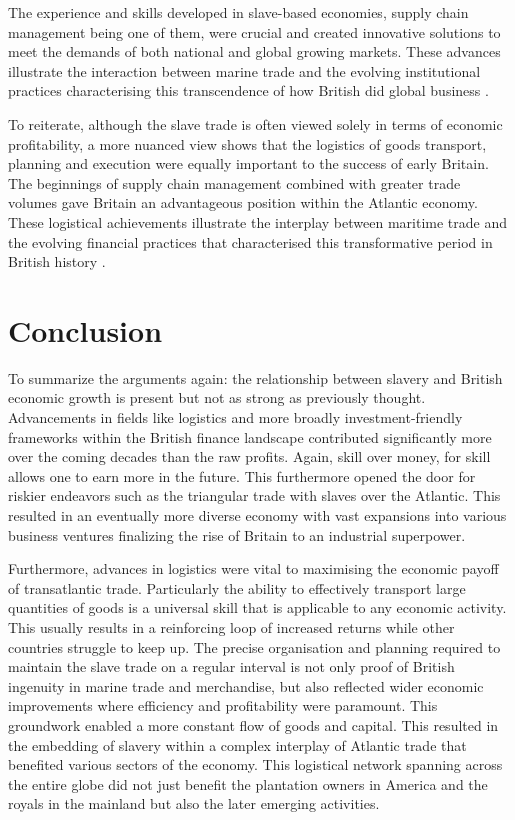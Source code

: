 \documentclass[a4paper,11pt]{article}
\begin{document}
The experience and skills developed in slave-based economies, supply chain management being one of them, were crucial and created innovative solutions to meet the demands of both national and global growing markets. These advances illustrate the interaction between marine trade and the evolving institutional practices characterising this transcendence of how British did global business \citep{berghudson2021}.

To reiterate, although the slave trade is often viewed solely in terms of economic profitability, a more nuanced view shows that the logistics of goods transport, planning and execution were equally important to the success of early Britain. The beginnings of supply chain management combined with greater trade volumes gave Britain an advantageous position within the Atlantic economy. These logistical achievements illustrate the interplay between maritime trade and the evolving financial practices that characterised this transformative period in British history \citep{harley2015}.

\section{Conclusion}

To summarize the arguments again: the relationship between slavery and British economic growth is present but not as strong as previously thought. Advancements in fields like logistics and more broadly investment-friendly frameworks within the British finance landscape contributed significantly more over the coming decades than the raw profits. Again, skill over money, for skill allows one to earn more in the future. This furthermore opened the door for riskier endeavors such as the triangular trade with slaves over the Atlantic. This resulted in an eventually more diverse economy with vast expansions into various business ventures finalizing the rise of Britain to an industrial superpower.

Furthermore, advances in logistics were vital to maximising the economic payoff of transatlantic trade. Particularly the ability to effectively transport large quantities of goods is a universal skill that is applicable to any economic activity. This usually results in a reinforcing loop of increased returns while other countries struggle to keep up. The precise organisation and planning required to maintain the slave trade on a regular interval is not only proof of British ingenuity in marine trade and merchandise, but also reflected wider economic improvements where efficiency and profitability were paramount. This groundwork enabled a more constant flow of goods and capital. This resulted in the embedding of slavery within a complex interplay of Atlantic trade that benefited various sectors of the economy. This logistical network spanning across the entire globe did not just benefit the plantation owners in America and the royals in the mainland but also the later emerging activities.
\end{document}
